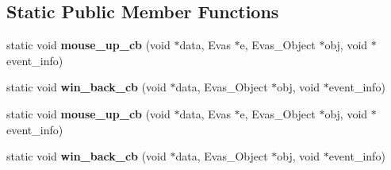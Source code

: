 \subsection*{Static Public Member Functions}
\begin{DoxyCompactItemize}
\item 
\mbox{\label{class__VideoPlayerTizen_ae04124976d1d69a6adcfb880802f1c2e}} 
static void {\bfseries mouse\+\_\+up\+\_\+cb} (void $\ast$data, Evas $\ast$e, Evas\+\_\+\+Object $\ast$obj, void $\ast$event\+\_\+info)
\item 
\mbox{\label{class__VideoPlayerTizen_a8b60c4a144ed382bed5c3818081c6b20}} 
static void {\bfseries win\+\_\+back\+\_\+cb} (void $\ast$data, Evas\+\_\+\+Object $\ast$obj, void $\ast$event\+\_\+info)
\item 
\mbox{\label{class__VideoPlayerTizen_ae04124976d1d69a6adcfb880802f1c2e}} 
static void {\bfseries mouse\+\_\+up\+\_\+cb} (void $\ast$data, Evas $\ast$e, Evas\+\_\+\+Object $\ast$obj, void $\ast$event\+\_\+info)
\item 
\mbox{\label{class__VideoPlayerTizen_a8b60c4a144ed382bed5c3818081c6b20}} 
static void {\bfseries win\+\_\+back\+\_\+cb} (void $\ast$data, Evas\+\_\+\+Object $\ast$obj, void $\ast$event\+\_\+info)
\end{DoxyCompactItemize}
